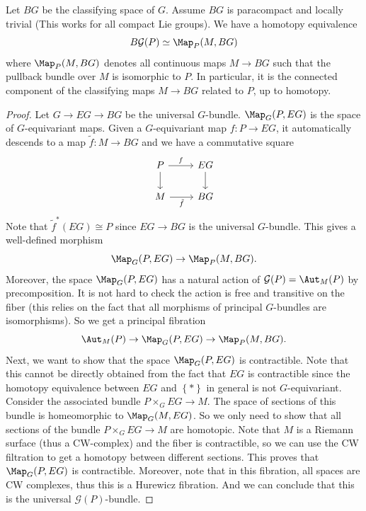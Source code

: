 \begin{proposition}
     Let \(BG\) be the classifying space of \(G\). Assume \(BG\) is paracompact and locally trivial (This works for all compact Lie groups). We have a homotopy equivalence 
     \[B \mathcal{G}(P)\simeq \Map_P(M,BG)\]
     where \(\Map_P(M,BG)\) denotes all continuous maps \(M\rightarrow BG\) such that the pullback bundle over \(M\) is isomorphic to \(P\). In particular, it is the connected component of the classifying maps \(M\rightarrow BG\) related to \(P\), up to homotopy.
\end{proposition}
\begin{proof}
    Let \(G\rightarrow EG\rightarrow BG\) be the universal \(G\)-bundle. \(\Map_G(P,EG)\) is the space of \(G\)-equivariant maps. Given a \(G\)-equivariant map \(f:P\rightarrow EG\), it automatically descends to a map \(\tilde{f}:M\rightarrow BG\) and we have a commutative square 
    \[\begin{tikzcd}
              P & EG \\
              M & BG
              \arrow["f", from=1-1, to=1-2]
              \arrow[from=1-1, to=2-1]
              \arrow[from=1-2, to=2-2]
              \arrow["{\tilde{f}}"', from=2-1, to=2-2]
         \end{tikzcd}\]
     Note that \(\tilde{f}^*(EG)\cong P\) since \(EG\rightarrow BG\) is the universal \(G\)-bundle. This gives a well-defined morphism 
     \[\Map_G(P,EG)\rightarrow \Map_P(M,BG).\]
     Moreover, the space \(\Map_G(P,EG)\) has a natural action of \(\mathcal{G}(P)=\Aut_M(P)\) by precomposition. It is not hard to check the action is free and transitive on the fiber (this relies on the fact that all morphisms of principal \(G\)-bundles are isomorphisms). So we get a principal fibration
     \[\Aut_M(P)\rightarrow \Map_G(P,EG)\rightarrow \Map_P(M,BG).\]
     Next, we want to show that the space \(\Map_G(P,EG)\) is contractible. Note that this cannot be directly obtained from the fact that \(EG\) is contractible since the homotopy equivalence between \(EG\) and \(\left\{ * \right\}\) in general is not \(G\)-equivariant. Consider the associated bundle \(P\times_G EG\rightarrow M\). The space of sections of this bundle is homeomorphic to \(\Map_G(M,EG)\). So we only need to show that all sections of the bundle \(P\times_G EG\rightarrow M\) are homotopic. Note that \(M\) is a Riemann surface (thus a CW-complex) and the fiber is contractible, so we can use the CW filtration to get a homotopy between different sections. This 
     proves that \(\Map_G(P,EG)\) is contractible. Moreover, note that in this fibration, all spaces are CW complexes, thus this is a Hurewicz fibration. And we can conclude that this is the universal \(\mathcal{G}(P)\)-bundle.


\end{proof}

